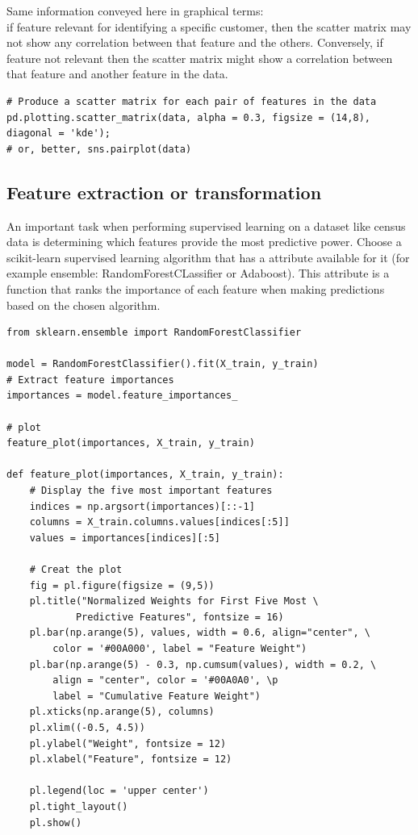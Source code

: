 \documentclass[11pt]{article}
\begin{document}
{\small Same information conveyed here in graphical terms: \\
if feature relevant for identifying a specific customer, then the scatter matrix may not show any correlation between that feature and the others. Conversely, if feature not relevant then the scatter matrix might show a correlation between that feature and another feature in the data.}
\begin{lstlisting}
# Produce a scatter matrix for each pair of features in the data
pd.plotting.scatter_matrix(data, alpha = 0.3, figsize = (14,8), diagonal = 'kde');
# or, better, sns.pairplot(data)
\end{lstlisting}

\subsection{Feature extraction or transformation}
An important task when performing supervised learning on a dataset like census data is determining which features provide the most predictive power.
Choose a scikit-learn supervised learning algorithm that has a  attribute available for it (for example ensemble: RandomForestCLassifier or Adaboost). This attribute is a function that ranks the importance of each feature when making predictions based on the chosen algorithm.

\begin{lstlisting}
from sklearn.ensemble import RandomForestClassifier

model = RandomForestClassifier().fit(X_train, y_train)
# Extract feature importances 
importances = model.feature_importances_ 

# plot
feature_plot(importances, X_train, y_train)

def feature_plot(importances, X_train, y_train):
	# Display the five most important features
	indices = np.argsort(importances)[::-1]
	columns = X_train.columns.values[indices[:5]]
	values = importances[indices][:5]

	# Creat the plot
	fig = pl.figure(figsize = (9,5))
	pl.title("Normalized Weights for First Five Most \
			Predictive Features", fontsize = 16)
	pl.bar(np.arange(5), values, width = 0.6, align="center", \ 
		color = '#00A000', label = "Feature Weight")
	pl.bar(np.arange(5) - 0.3, np.cumsum(values), width = 0.2, \
		align = "center", color = '#00A0A0', \p
		label = "Cumulative Feature Weight")
	pl.xticks(np.arange(5), columns)
	pl.xlim((-0.5, 4.5))
	pl.ylabel("Weight", fontsize = 12)
	pl.xlabel("Feature", fontsize = 12)

	pl.legend(loc = 'upper center')
	pl.tight_layout()
	pl.show()  
\end{lstlisting}
\end{document}
